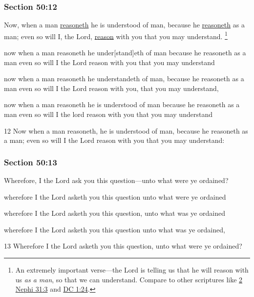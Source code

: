 	\subsubsection{Section 50:12} %
		\label{DC50-12}

		Now, when a man \hyperref[REASON]{reasoneth} he is understood of man, because he \hyperref[REASON]{reasoneth} as a man; even so will I, the Lord, \hyperref[REASON]{reason} with you that you may understand.%
			\footnote{%
				An extremely important verse---the Lord is telling us that he will reason with us \textit{as a man}, so that we can understand. Compare to other scriptures like \hyperref[2NEPHI-31-3]{2 Nephi 31:3} and \hyperref[DC1-24]{DC 1:24}.
				}

		\begin{framed}
		\scriptsize
			\begin{compactdesc}
				\item[JSP] now when a man reasoneth he under[stand]eth of man because he reasoneth as a man even so will I the Lord reason with you that you may understand
				\item[Gilbert] now when a man reasoneth he understandeth of man, because he reasoneth as a man even so will I the Lord reason with you, that you may understand,
				\item[Hyde and Smith] now when a man reasoneth he is understood of man because he reasoneth as a man even so will I the lord reason with you that you may understand
				\item[BC] 12 Now when a man reasoneth, he is understood of man, because he reasoneth as a man; even so will I the Lord reason with you that you may understand:
			\end{compactdesc}
		\end{framed}

	\subsubsection{Section 50:13} %
		\label{DC50-13}

		Wherefore, I the Lord ask you this question---unto what were ye ordained?

		\begin{framed}
		\scriptsize
			\begin{compactdesc}
				\item[JSP] wherefore I the Lord asketh you this question unto what were ye ordained
				\item[Gilbert] wherefore I the Lord asketh you this question, unto what was ye ordained
				\item[Hyde and Smith] wherefore I the Lord asketh you this question unto what was ye ordained,
				\item[BC] 13 Wherefore I the Lord asketh you this question, unto what were ye ordained?
			\end{compactdesc}
		\end{framed}

